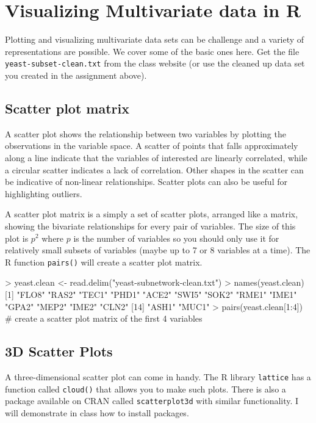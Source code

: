 
\section{Visualizing Multivariate data in R}

Plotting and visualizing multivariate data sets can be challenge and a
variety of representations are possible. We cover some of the basic ones
here. Get the file \lstinline!yeast-subset-clean.txt! from the class
website (or use the cleaned up data set you created in the assignment
above).

\subsection{Scatter plot matrix}

A scatter plot shows the relationship between two variables by plotting
the observations in the variable space. A scatter of points that falls
approximately along a line indicate that the variables of interested are
linearly correlated, while a circular scatter indicates a lack of
correlation. Other shapes in the scatter can be indicative of non-linear
relationships. Scatter plots can also be useful for highlighting
outliers.

A scatter plot matrix is a simply a set of scatter plots, arranged like
a matrix, showing the bivariate relationships for every pair of
variables. The size of this plot is $p^2$ where $p$ is the number of
variables so you should only use it for relatively small subsets of
variables (maybe up to 7 or 8 variables at a time). The R function
\lstinline!pairs()! will create a scatter plot matrix.

\begin{R}
> yeast.clean <- read.delim("yeast-subnetwork-clean.txt")
> names(yeast.clean)
 [1] "FLO8" "RAS2" "TEC1" "PHD1" "ACE2" "SWI5" "SOK2" "RME1" "IME1" "GPA2" "MEP2" "IME2" "CLN2"
[14] "ASH1" "MUC1"
> pairs(yeast.clean[1:4]) # create a scatter plot matrix of the first 4 variables
\end{R}
\subsection{3D Scatter Plots}

A three-dimensional scatter plot can come in handy. The R library
\lstinline!lattice! has a function called \lstinline!cloud()! that
allows you to make such plots. There is also a package available on CRAN
called \lstinline!scatterplot3d! with similar functionality. I will
demonstrate in class how to install packages.

